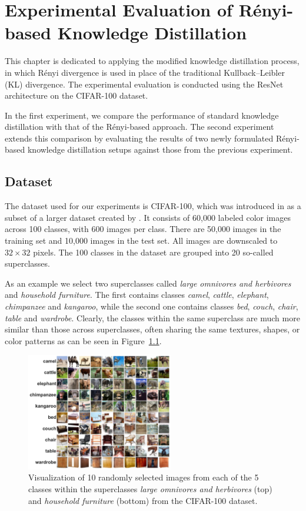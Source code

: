 \chapter{Experimental Evaluation of Rényi-based Knowledge Distillation}

This chapter is dedicated to applying the modified knowledge distillation process, in which Rényi divergence is used in place of the traditional Kullback–Leibler (KL) divergence. The experimental evaluation is conducted using the ResNet architecture on the CIFAR-100 dataset.

In the first experiment, we compare the performance of standard knowledge distillation with that of the Rényi-based approach. The second experiment extends this comparison by evaluating the results of two newly formulated Rényi-based knowledge distillation setups against those from the previous experiment.

\section{Dataset}

The dataset used for our experiments is CIFAR-100, which was introduced in \cite{Krizhevsky2009} as a subset of a larger dataset created by \cite{TorralbaFergusFreeman2008}. It consists of 60,000 labeled color images across 100 classes, with 600 images per class. There are 50,000 images in the training set and 10,000 images in the test set. All images are downscaled to $32 \times 32$ pixels. The 100 classes in the dataset are grouped into 20 so-called superclasses.

As an example we select two superclasses called \textit{large omnivores and herbivores} and \textit{household furniture}. The first contains classes \textit{camel}, \textit{cattle}, \textit{elephant}, \textit{chimpanzee} and \textit{kangaroo}, while the second one contains classes \textit{bed}, \textit{couch}, \textit{chair}, \textit{table} and \textit{wardrobe}. Clearly, the classes within the same superclass are much more similar than those across superclasses, often sharing the same textures, shapes, or color patterns as can be seen in Figure~\ref{fig:cifar100}.

\begin{figure}[h!]
	\centering
	\includegraphics[width=0.57\textwidth]{../img/cifar100_grid.pdf}
	\caption{Visualization of 10 randomly selected images from each of the 5 classes within the superclasses \textit{large omnivores and herbivores} (top) and \textit{household furniture} (bottom) from the CIFAR-100 dataset.}
	\label{fig:cifar100}
\end{figure}


